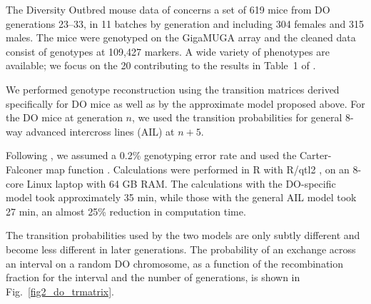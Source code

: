 \documentclass[12pt,letterpaper]{article}\usepackage[]{graphicx}\usepackage[table]{xcolor}
\begin{document}
The Diversity Outbred mouse data of \citet{albarghouthi2021} concerns
a set of 619 mice from DO generations
23--33,
in 11 batches by generation
and including 304 females and
315 males. The mice were genotyped on
the GigaMUGA array \citep{morgan2016} and the cleaned data consist of
genotypes at 109,427 markers. A wide variety
of phenotypes are available; we focus on the 20
contributing to the results in Table~1 of \citet{albarghouthi2021}.

We performed genotype reconstruction using the transition matrices
derived specifically for DO mice \citep{broman2019} as well as by the
approximate model proposed above. For the DO mice at generation $n$,
we used the transition probabilities for general 8-way advanced
intercross lines (AIL) at $n+5$.

Following \citet{albarghouthi2021},
we assumed a 0.2\% genotyping error rate and used the Carter-Falconer
map function \citep{carter1951}. Calculations were performed in R
\citep{rcore} with R/qtl2 \citep{rqtl2}, on an 8-core Linux laptop with
64 GB RAM. The calculations with the DO-specific model took
approximately 35 min, while those with the general AIL model took
27 min, an almost 25\% reduction in computation time.

The transition probabilities used by the two models are only subtly
different and become less different in later generations. The
probability of an exchange across an interval on a random DO
chromosome, as a function of the recombination fraction for the
interval and the number of generations, is shown in
Fig.~\ref{fig2_do_trmatrix}.
\end{document}
